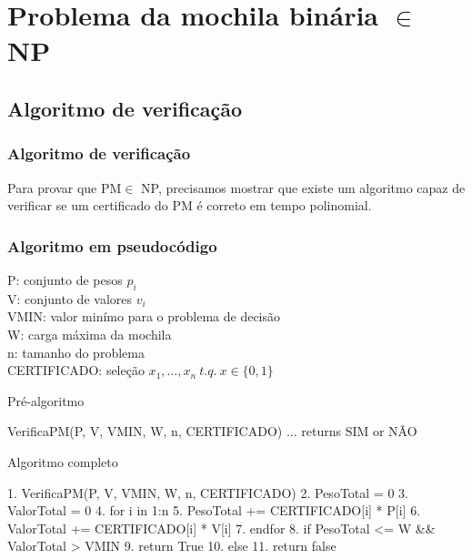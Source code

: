 \documentclass{beamer}
\begin{document}

\section{Problema da mochila binária $\in$ NP}

\subsection{Algoritmo de verificação}
\begin{frame}
    \frametitle{Algoritmo de verificação}
    Para provar que PM\footnotemark $\in$ NP, precisamos mostrar que existe um algoritmo
    capaz de verificar se um certificado do PM é correto em tempo polinomial.

\end{frame}


\begin{frame}[fragile]
    \frametitle{Algoritmo em pseudocódigo}

    P: conjunto de pesos $p_{i}$ \\
    V: conjunto de valores $v_{i}$ \\
    VMIN: valor minímo para o problema de decisão \\
    W: carga máxima da mochila \\
    n: tamanho do problema \\
    CERTIFICADO: seleção $x_{1},...,x_{n}\ t.q.\ x \in \{0,1\}$ \\

    \begin{block}{Pré-algoritmo}
    \begin{semiverbatim}
    VerificaPM(P, V, VMIN, W, n, CERTIFICADO)
        ...
        returns SIM or NÃO
    \end{semiverbatim}
    \end{block}

\end{frame}

\begin{frame}[fragile]
    \begin{block}{Algoritmo completo}
        \begin{semiverbatim}
        1. VerificaPM(P, V, VMIN, W, n, CERTIFICADO)
        2.    PesoTotal = 0
        3.    ValorTotal = 0
        4.    for i in 1:n
        5.        PesoTotal += CERTIFICADO[i] * P[i]
        6.        ValorTotal += CERTIFICADO[i] * V[i]
        7.    endfor
        8.    if PesoTotal <= W && ValorTotal > VMIN
        9.        return True
        10.    else
        11.       return false
        \end{semiverbatim}
    \end{block}

\end{frame}
\end{document}
